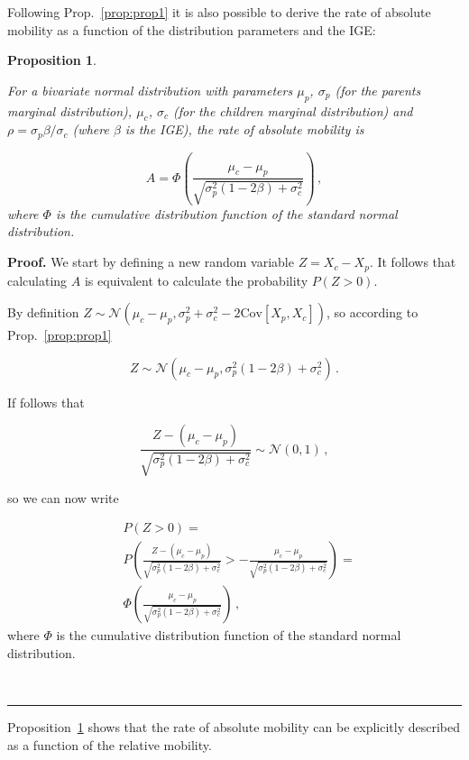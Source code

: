 \documentclass[prl,amsmath,twocolumn,nofootinbib]{revtex4}
\newcommand{\elabel}[1]{\label{eq:#1}}
\newcommand{\Pref}[1]{Proposition~\ref{prop:#1}}
\newcommand{\pref}[1]{Prop.~\ref{prop:#1}}
\newcommand{\be}{\begin{equation}}
\newcommand{\ee}{\end{equation}}
\newtheorem{proposition}{Proposition}
\newenvironment{proof}[1][Proof]{\noindent\textbf{#1.} }{\ \rule{0.5em}{0.5em}}
\numberwithin{equation}{section}
\begin{document}
Following \pref{prop1} it is also possible to derive the rate of absolute mobility as a function of the distribution parameters and the IGE:

\begin{proposition}
\label{prop:prop2}

For a bivariate normal distribution with parameters $\mu_p$, $\sigma_p$ (for the parents marginal distribution), $\mu_c$, $\sigma_c$ (for the children marginal distribution) and $\rho=\sigma_p\beta/\sigma_c$ (where $\beta$ is the IGE), the rate of absolute mobility is

\be
A = \Phi\left(\frac{\mu_c - \mu_p}{\sqrt{\sigma_p^2\left(1 - 2\beta\right) + \sigma_c^2}}\right) \,,
\elabel{abs2}
\ee
where $\Phi$ is the cumulative distribution function of the standard normal distribution.
\end{proposition}

\begin{proof}
We start by defining a new random variable $Z = X_c-X_p$. It follows that calculating $A$ is equivalent to calculate the probability $P\left(Z>0\right)$.

By definition $Z \sim \mathcal{N}\left(\mu_c - \mu_p,\sigma_p^2 + \sigma_c^2 - 2\text{Cov}\left[X_p,X_c\right]\right)$, so according to \pref{prop1}

\be
Z \sim \mathcal{N}\left(\mu_c - \mu_p,\sigma_p^2\left(1-2\beta\right) + \sigma_c^2\right)\,.
\ee

If follows that

\be
\frac{Z - \left(\mu_c - \mu_p\right)}{\sqrt{\sigma_p^2\left(1-2\beta\right) + \sigma_c^2}} \sim \mathcal{N}\left(0,1\right)\,,
\ee

so we can now write

\be
\begin{split}
&P\left(Z>0\right) = \\ & P\left(\frac{Z - (\mu_c - \mu_p)}{\sqrt{\sigma_p^2\left(1-2\beta\right) + \sigma_c^2}} > -\frac{\mu_c - \mu_p}{\sqrt{\sigma_p^2\left(1-2\beta\right) + \sigma_c^2}} \right) = \\ &\Phi\left(\frac{\mu_c - \mu_p}{\sqrt{\sigma_p^2\left(1 - 2\beta\right) + \sigma_c^2}}\right) \,,
\end{split}
\ee
where $\Phi$ is the cumulative distribution function of the standard normal distribution.

\end{proof}

\Pref{prop2} shows that the rate of absolute mobility can be explicitly described as a function of the relative mobility.



\end{document}
